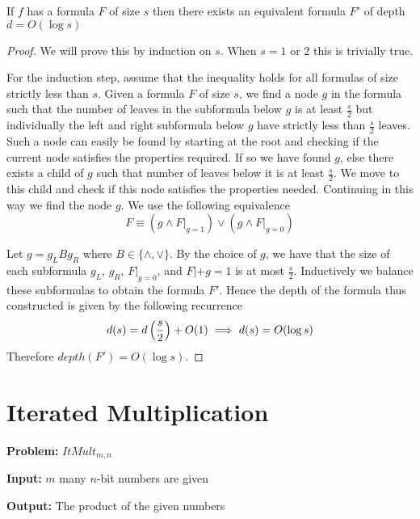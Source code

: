 \begin{theorem}
	If $f$ has a formula $F$ of size $s$ then there exists an equivalent formula $F'$ of depth $d= O(\log s)$
\end{theorem}
\begin{proof}
	We will prove this by induction on $s$. When $s=1 $ or 2 this is trivially true. 
	
	For the induction step, assume that the inequality holds for all formulas of size strictly 	less than $s$. Given a formula $F$ of size $s$, we find a node $g$ in the formula such that the 	number of leaves in the subformula below $g$ is at least $\frac{s}{2}$ but individually the left and right subformula below $g$ have strictly less than $\frac{s}2$ leaves. Such a node can easily be found by 	starting at the root and checking if the current node satisfies the properties required. If so 	we have found $g$, else there exists a child of $g$ such that number of leaves below it is at least $\frac{s}2$. We move to this child and check if this node satisfies the properties needed. Continuing 	in this way we find the node $g$. We use the following equivalence $$F\equiv (g\wedge F|_{g=1})\vee (g\wedge F|_{g=0})$$
	
	Let $g=g_LBg_R$ where $B\in \{\wedge,\vee\}$. By the choice of $g$, we have that the size of each subformula $g_L$, $g_R$, $F|_{g=0}$, and $F|+{g=1}$ is at most $\frac{s}{2}$. Inductively we balance these subformulas to obtain the formula $F'$. Hence the depth of the formula thus constructed is given by the following recurrence $$d(s)=d\left(\frac{s}{2}\right)+O(1)\implies d(s)=O(\log s)$$
	Therefore $depth(F')=O(\log s)$.%
\end{proof}
\section{Iterated Multiplication}
\parinf
\textbf{Problem:} $ItMult_{m,n}$

\textbf{Input:} $m$ many $n$-bit numbers are given

\textbf{Output:} The product of the given numbers

